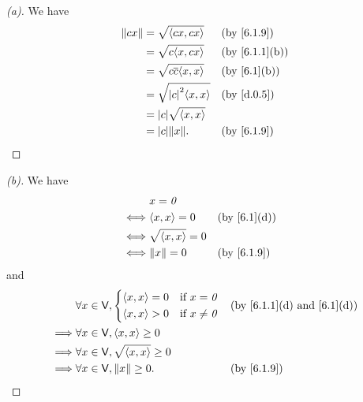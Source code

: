 \begin{proof}[(a)]
  We have
  \begin{align*}
    \norm{cx} & = \sqrt{\inn{cx, cx}}          &  & \text{(by \cref{6.1.9})}    \\
              & = \sqrt{c \inn{x, cx}}         &  & \text{(by \cref{6.1.1}(b))} \\
              & = \sqrt{c \conj{c} \inn{x, x}} &  & \text{(by \cref{6.1}(b))}   \\
              & = \sqrt{\abs{c}^2 \inn{x, x}}  &  & \text{(by \cref{d.0.5})}    \\
              & = \abs{c} \sqrt{\inn{x, x}}                                     \\
              & = \abs{c} \norm{x}.            &  & \text{(by \cref{6.1.9})}
  \end{align*}
\end{proof}

\begin{proof}[(b)]
  We have
  \begin{align*}
         & x = \zv                                              \\
    \iff & \inn{x, x} = 0        &  & \text{(by \cref{6.1}(d))} \\
    \iff & \sqrt{\inn{x, x}} = 0                                \\
    \iff & \norm{x} = 0          &  & \text{(by \cref{6.1.9})}
  \end{align*}
  and
  \begin{align*}
             & \forall x \in \V, \begin{dcases}
                                   \inn{x, x} = 0 & \text{if } x = \zv    \\
                                   \inn{x, x} > 0 & \text{if } x \neq \zv
                                 \end{dcases}  &  & \text{(by \cref{6.1.1}(d) and \cref{6.1}(d))} \\
    \implies & \forall x \in \V, \inn{x, x} \geq 0                                                \\
    \implies & \forall x \in \V, \sqrt{\inn{x, x}} \geq 0                                         \\
    \implies & \forall x \in \V, \norm{x} \geq 0.         &  & \text{(by \cref{6.1.9})}
  \end{align*}
\end{proof}

